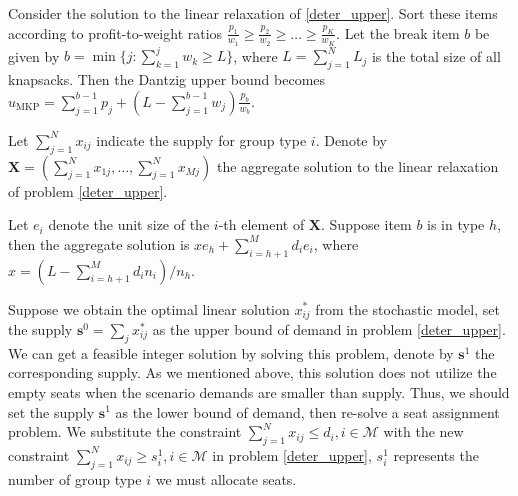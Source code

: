 Consider the solution to the linear relaxation of \eqref{deter_upper}. Sort these items according to profit-to-weight ratios $\frac{p_1}{w_1} \geq \frac{p_2}{w_2} \geq \ldots \geq \frac{p_K}{w_K}$.
Let the break item $b$ be given by $b=\min \{j: \sum_{k=1}^j w_k \geq L\}$, where $L = \sum_{j=1}^{N} L_j$ is the total size of all knapsacks. Then the Dantzig upper bound \cite{dantzig1957discrete} becomes 
$u_{\mathrm{MKP}}=\sum_{j=1}^{b-1} p_j+\left(L-\sum_{j=1}^{b-1} w_j\right) \frac{p_b}{w_b}$. 

Let $\sum_{j=1}^{N} x_{ij}$ indicate the supply for group type $i$. Denote by $\mathbf{X} = (\sum_{j=1}^{N} x_{1j},\ldots, \sum_{j=1}^{N} x_{Mj})$ the aggregate solution to the linear relaxation of problem \eqref{deter_upper}.

\begin{lem}
Let $e_{i}$ denote the unit size of the $i$-th element of $\mathbf{X}$.
Suppose item $b$ is in type $h$, then the aggregate solution is $x e_{h} + \sum_{i=h+1} ^{M} d_{i} e_{i}$, where $x = (L- \sum_{i = h+1}^{M} {d_i n_i})/ n_h$.  
\end{lem}





Suppose we obtain the optimal linear solution $x^{*}_{ij}$ from the stochastic model, set the supply $\mathbf{s}^{0} = \sum_{j} x^{*}_{ij}$ as the upper bound of demand in problem \eqref{deter_upper}. We can get a feasible integer solution by solving this problem, denote by $\mathbf{s}^{1}$ the corresponding supply. As we mentioned above, this solution does not utilize the empty seats when the scenario demands are smaller than supply. Thus, we should set the supply $\mathbf{s}^{1}$ as the lower bound of demand, then re-solve a seat assignment problem. We substitute the constraint $\sum_{j =1}^{N} x_{ij} \leq d_{i}, i \in \mathcal{M}$ with the new constraint $\sum_{j =1}^{N} x_{ij} \geq s_{i}^{1}, i \in \mathcal{M}$ in problem \eqref{deter_upper}, $s_{i}^{1}$ represents the number of group type $i$ we must allocate seats.

